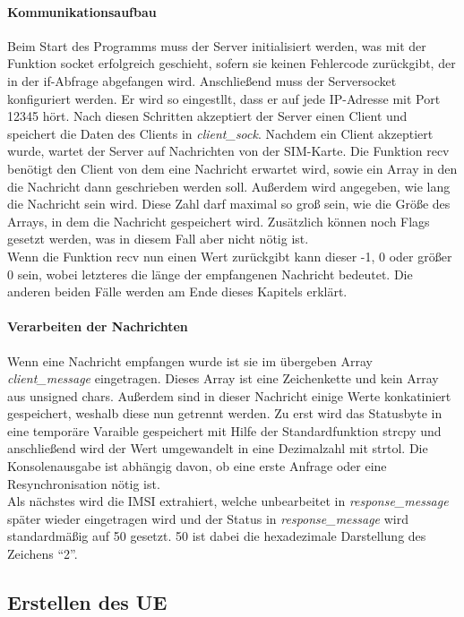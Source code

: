 		\paragraph{Kommunikationsaufbau}
		Beim Start des Programms muss der Server initialisiert werden, was mit der Funktion socket erfolgreich
		geschieht, sofern sie keinen Fehlercode zurückgibt, der in der if-Abfrage abgefangen wird. Anschließend muss
		der Serversocket konfiguriert werden. Er wird so eingestllt, dass er auf jede IP-Adresse mit Port 12345
		hört. %
		Nach diesen Schritten akzeptiert der Server einen Client und speichert die Daten des Clients in \emph{client\_sock}.
		Nachdem ein Client akzeptiert wurde, wartet der Server auf Nachrichten von der SIM-Karte. Die Funktion recv
		benötigt den Client von dem eine Nachricht erwartet wird, sowie ein Array in den die Nachricht dann
		geschrieben werden soll. Außerdem wird angegeben, wie lang die Nachricht sein wird. Diese Zahl darf maximal
		so groß sein, wie die Größe des Arrays, in dem die Nachricht gespeichert wird. Zusätzlich können noch Flags
		gesetzt werden, was in diesem Fall aber nicht nötig ist. \\
		Wenn die Funktion recv nun einen Wert zurückgibt kann dieser -1, 0 oder größer 0 sein, wobei letzteres die
		länge der empfangenen Nachricht bedeutet. Die anderen beiden Fälle werden am Ende dieses Kapitels erklärt.
		
		\paragraph{Verarbeiten der Nachrichten}
		Wenn eine Nachricht empfangen wurde ist sie im übergeben Array \emph{client\_message} eingetragen. Dieses
		Array ist eine Zeichenkette und kein Array aus unsigned chars. Außerdem sind in dieser Nachricht einige
		Werte konkatiniert gespeichert, weshalb diese nun getrennt werden. Zu erst wird das Statusbyte in eine
		temporäre Varaible gespeichert mit Hilfe der Standardfunktion strcpy und anschließend wird der Wert
		umgewandelt in eine Dezimalzahl mit strtol. Die Konsolenausgabe ist abhängig davon, ob eine erste Anfrage
		oder eine Resynchronisation nötig ist. \\
		Als nächstes wird die IMSI extrahiert, welche unbearbeitet in \emph{response\_message} später wieder
		eingetragen wird und der Status in \emph{response\_message} wird standardmäßig auf 50 gesetzt. 50 ist
		dabei die hexadezimale Darstellung des Zeichens ``2''.
		
	\subsection{Erstellen des UE}

